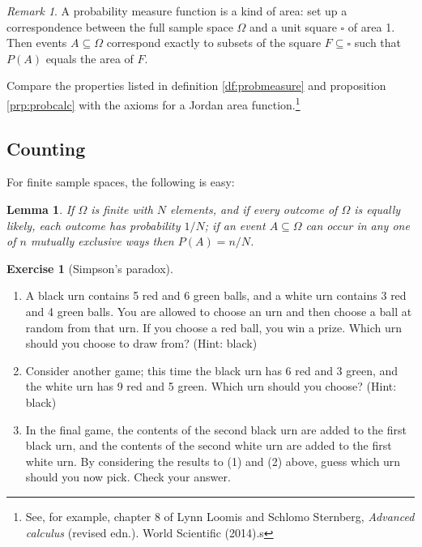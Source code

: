 \documentclass[a4paper,leqno]{article}
\numberwithin{equation}{section}
\newtheorem{lem}[equation]{Lemma}
\theoremstyle{definition}
\newtheorem{exercise}[equation]{Exercise}
\theoremstyle{remark}
\newtheorem{rem}[equation]{Remark}
\begin{document}
\begin{rem}
  A probability measure function is a kind of area: set up a correspondence between the full sample
  space $ \Omega $ and a unit square $ \square $ of area 1. Then events $ A \subseteq \Omega $ correspond exactly
  to subsets of the square $ F \subseteq \square $ such that $ P(A) $ equals the area of $ F $.

  Compare the properties listed in definition \ref{df:probmeasure} and proposition \ref{prp:probcalc} with
  the axioms for a Jordan area function.\footnote{See, for example, chapter 8 of Lynn Loomis and Schlomo
  Sternberg, \emph{Advanced calculus} (revised edn.). World Scientific (2014).s}
\end{rem}

\subsection{Counting}
For finite sample spaces, the following is easy:
\begin{lem}
  If $ \Omega $ is finite with $ N $ elements, and if every outcome of $ \Omega $ is equally likely, each outcome
  has probability $ 1/N $; if an event $ A \subseteq \Omega $ can occur in any one of $ n $ mutually exclusive ways
  then $ P(A) = n/N $.
\end{lem}

\begin{exercise}[Simpson's paradox]\leavevmode
  \begin{enumerate}
    \item A black urn contains 5 red and 6 green balls, and a white urn contains 3 red and 4 green balls. You are allowed
          to choose an urn and then choose a ball at random from that urn. If you choose a red ball, you win a prize. Which urn
          should you choose to draw from? (Hint: black)
    \item Consider another game; this time the black urn has 6 red and 3 green, and the white urn has 9 red and 5 green. Which
          urn should you choose? (Hint: black)
    \item In the final game, the contents of the second black urn are added to the first black urn, and the contents of the second
          white urn are added to the first white urn. By considering the results to (1) and (2) above, guess which urn should you now pick. Check your answer.
  \end{enumerate}
\end{exercise}
\end{document}
